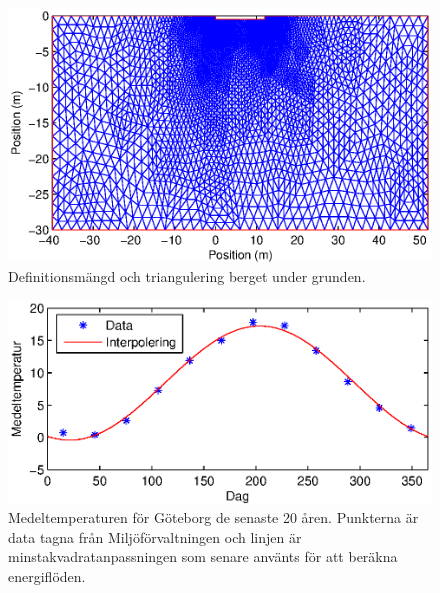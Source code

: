 \begin{figure}
\centering
\includegraphics{images/trifoundation.eps}
\caption{Definitionsmängd och triangulering berget under grunden.}
\label{fig:foundation:tri}
\end{figure}


\begin{figure}
\centering
\includegraphics{images/meantemperature.eps}
\caption{
Medeltemperaturen för Göteborg de senaste 20 åren. Punkterna är data tagna från Miljöförvaltningen och linjen är minstakvadratanpassningen som senare använts för att beräkna energiflöden.}
\label{fig:foundation:meantemperature}
\end{figure}

